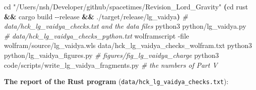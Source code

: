 \documentclass[
  10pt,
]{article}
\newenvironment{Shaded}{}{}
\newcommand{\AttributeTok}[1]{\textcolor[rgb]{0.49,0.56,0.16}{#1}}
\newcommand{\BuiltInTok}[1]{\textcolor[rgb]{0.00,0.50,0.00}{#1}}
\newcommand{\CommentTok}[1]{\textcolor[rgb]{0.38,0.63,0.69}{\textit{#1}}}
\newcommand{\ExtensionTok}[1]{#1}
\newcommand{\KeywordTok}[1]{\textcolor[rgb]{0.00,0.44,0.13}{\textbf{#1}}}
\newcommand{\NormalTok}[1]{#1}
\newcommand{\StringTok}[1]{\textcolor[rgb]{0.25,0.44,0.63}{#1}}
\begin{document}
\begin{Shaded}
\begin{Highlighting}[]
\BuiltInTok{cd} \StringTok{"/Users/nsh/Developer/github/spacetimes/Revision\_Lord\_Gravity"}
\KeywordTok{(}\BuiltInTok{cd}\NormalTok{ rust }\KeywordTok{\&\&} \ExtensionTok{cargo}\NormalTok{ build }\AttributeTok{{-}{-}release} \KeywordTok{\&\&} \ExtensionTok{./target/release/lg\_vaidya}\KeywordTok{)} \CommentTok{\# data/hck\_lg\_vaidya\_checks.txt and the data files}
\ExtensionTok{python3}\NormalTok{ python/lg\_vaidya.py                                       }\CommentTok{\# data/hck\_lg\_vaidya\_checks\_python.txt}
\ExtensionTok{wolframscript} \AttributeTok{{-}file}\NormalTok{ wolfram/source/lg\_vaidya.wls data/hck\_lg\_vaidya\_checks\_wolfram.txt}
\ExtensionTok{python3}\NormalTok{ python/lg\_vaidya\_figures.py                               }\CommentTok{\# figures/fig\_lg\_vaidya\_charge}
\ExtensionTok{python3}\NormalTok{ code/scripts/write\_lg\_vaidya\_fragments.py                }\CommentTok{\# the numbers of Part V}
\end{Highlighting}
\end{Shaded}

\textbf{The report of the Rust program}
(\texttt{data/hck\_lg\_vaidya\_checks.txt}):
\end{document}
